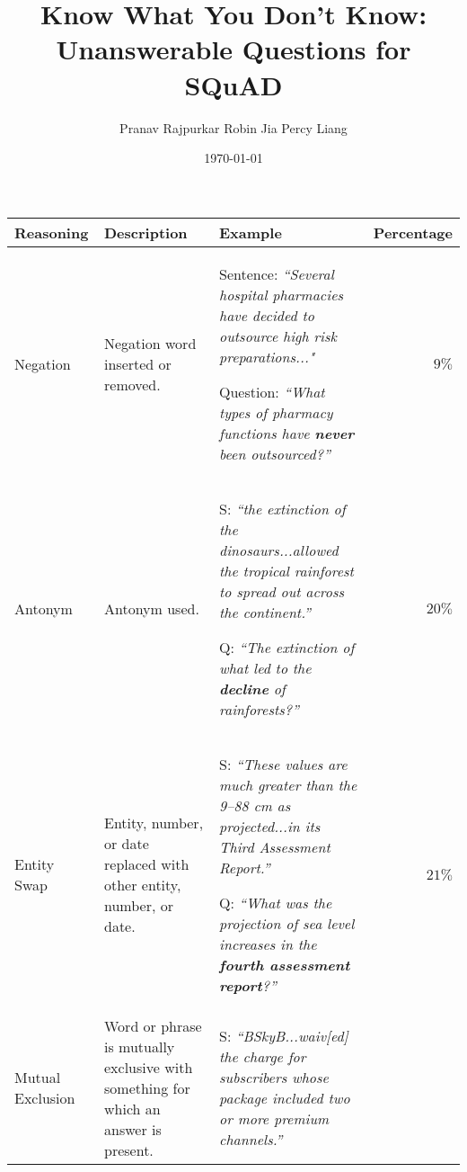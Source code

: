\documentclass{article}
\title{\textbf{Know What You Don’t Know: Unanswerable Questions for SQuAD}}
\author{Pranav Rajpurkar \hspace{0.7in} Robin Jia \hspace{0.7in} Percy Liang}
\date{\today}
\begin{document}
\maketitle

\begin{table}[h]
    \centering
    \begin{tabular}{| L{2cm} L{3.7cm} L{7.818cm} r |}
         \hline
         \textbf{Reasoning} & \textbf{Description} & \textbf{Example} & \textbf{Percentage}\\
         \hline
         \begin{center}
             Negation 
         \end{center}
         & Negation word inserted or removed. 
         & Sentence: \textit{“Several hospital pharmacies have decided to
        outsource high risk preparations..."}\par
        Question: \textit{“What types of pharmacy functions have \textbf{never}
        been outsourced?”}
        & $9\%$\\
        \hline
        \begin{center}
        Antonym
        \end{center}
        & Antonym used.
        & S: \textit{“the extinction of the dinosaurs...allowed the
        tropical rainforest to spread out across the continent.”}\par
        Q: \textit{“The extinction of what led to the \textbf{decline} of rainforests?”}
        & $20\%$\\
        \hline
        \begin{center}
        Entity Swap
        \end{center}
        & Entity, number, or date replaced with other entity, number, or date.
        & S: \textit{“These values are much greater than the 9–88 cm
        as projected...in its Third Assessment Report.”}\par
        Q: \textit{“What was the projection of sea level increases in the
        \textbf{fourth assessment report}?”}
        & $21\%$\\
        \hline
        \begin{center}
        Mutual
        Exclusion
        \end{center}
        & Word or phrase is
        mutually exclusive
        with something for which
        an answer is present.
        & S: \textit{“BSkyB...waiv[ed] the charge for subscribers whose
        package included two or more premium channels.”}\par

\end{tabular}
\end{table}
\end{document}
